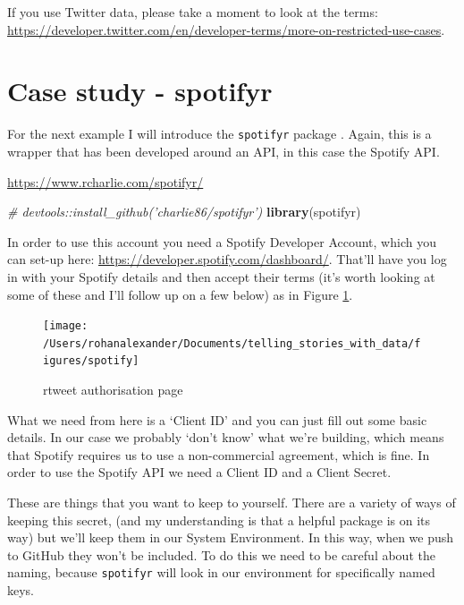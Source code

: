 \documentclass[
]{book}
\newenvironment{Shaded}{\begin{snugshade}}{\end{snugshade}}
\newcommand{\CommentTok}[1]{\textcolor[rgb]{0.56,0.35,0.01}{\textit{#1}}}
\newcommand{\KeywordTok}[1]{\textcolor[rgb]{0.13,0.29,0.53}{\textbf{#1}}}
\newcommand{\NormalTok}[1]{#1}
\begin{document}
If you use Twitter data, please take a moment to look at the terms: \url{https://developer.twitter.com/en/developer-terms/more-on-restricted-use-cases}.

\hypertarget{case-study---spotifyr}{%
\section{Case study - spotifyr}\label{case-study---spotifyr}}

For the next example I will introduce the \texttt{spotifyr} package \citep{spotifyr}. Again, this is a wrapper that has been developed around an API, in this case the Spotify API.

\url{https://www.rcharlie.com/spotifyr/}

\begin{Shaded}
\begin{Highlighting}[]
\CommentTok{# devtools::install_github('charlie86/spotifyr')}
\KeywordTok{library}\NormalTok{(spotifyr)}
\end{Highlighting}
\end{Shaded}

In order to use this account you need a Spotify Developer Account, which you can set-up here: \url{https://developer.spotify.com/dashboard/}. That'll have you log in with your Spotify details and then accept their terms (it's worth looking at some of these and I'll follow up on a few below) as in Figure \ref{fig:spotifyaccept}.

\begin{figure}
\texttt{[image: /Users/rohanalexander/Documents/telling\_stories\_with\_data/figures/spotify]} \caption{rtweet authorisation page}\label{fig:spotifyaccept}
\end{figure}

What we need from here is a `Client ID' and you can just fill out some basic details. In our case we probably `don't know' what we're building, which means that Spotify requires us to use a non-commercial agreement, which is fine. In order to use the Spotify API we need a Client ID and a Client Secret.

These are things that you want to keep to yourself. There are a variety of ways of keeping this secret, (and my understanding is that a helpful package is on its way) but we'll keep them in our System Environment. In this way, when we push to GitHub they won't be included. To do this we need to be careful about the naming, because \texttt{spotifyr} will look in our environment for specifically named keys.
\end{document}
